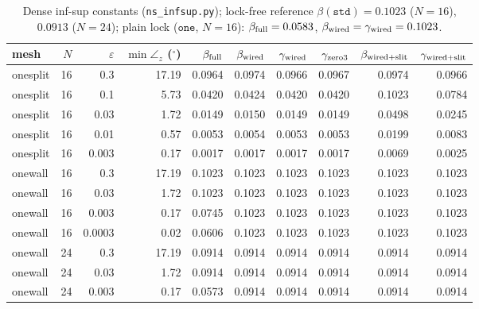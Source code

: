 \begin{table}[ht]\centering\small
\begin{tabular}{lrrrrrrrrr}\toprule
mesh & $N$ & $\varepsilon$ & $\min\angle_z$ ($^\circ$) & $\beta_{\rm full}$ & $\beta_{\rm wired}$ & $\gamma_{\rm wired}$ & $\gamma_{\rm zero3}$ & $\beta_{\rm wired+slit}$ & $\gamma_{\rm wired+slit}$\\\midrule
onesplit & 16 & 0.3 & 17.19 & 0.0964 & 0.0974 & 0.0966 & 0.0967 & 0.0974 & 0.0966\\
onesplit & 16 & 0.1 & 5.73 & 0.0420 & 0.0424 & 0.0420 & 0.0420 & 0.1023 & 0.0784\\
onesplit & 16 & 0.03 & 1.72 & 0.0149 & 0.0150 & 0.0149 & 0.0149 & 0.0498 & 0.0245\\
onesplit & 16 & 0.01 & 0.57 & 0.0053 & 0.0054 & 0.0053 & 0.0053 & 0.0199 & 0.0083\\
onesplit & 16 & 0.003 & 0.17 & 0.0017 & 0.0017 & 0.0017 & 0.0017 & 0.0069 & 0.0025\\
onewall & 16 & 0.3 & 17.19 & 0.1023 & 0.1023 & 0.1023 & 0.1023 & 0.1023 & 0.1023\\
onewall & 16 & 0.03 & 1.72 & 0.1023 & 0.1023 & 0.1023 & 0.1023 & 0.1023 & 0.1023\\
onewall & 16 & 0.003 & 0.17 & 0.0745 & 0.1023 & 0.1023 & 0.1023 & 0.1023 & 0.1023\\
onewall & 16 & 0.0003 & 0.02 & 0.0606 & 0.1023 & 0.1023 & 0.1023 & 0.1023 & 0.1023\\
onewall & 24 & 0.3 & 17.19 & 0.0914 & 0.0914 & 0.0914 & 0.0914 & 0.0914 & 0.0914\\
onewall & 24 & 0.03 & 1.72 & 0.0914 & 0.0914 & 0.0914 & 0.0914 & 0.0914 & 0.0914\\
onewall & 24 & 0.003 & 0.17 & 0.0573 & 0.0914 & 0.0914 & 0.0914 & 0.0914 & 0.0914\\
\bottomrule\end{tabular}
\caption{Dense inf-sup constants (\texttt{ns\_infsup.py}); lock-free reference $\beta(\texttt{std})=0.1023$ ($N=16$), $0.0913$ ($N=24$);
plain lock ($\texttt{one}$, $N=16$): $\beta_{\rm full}=0.0583$, $\beta_{\rm wired}=\gamma_{\rm wired}=0.1023$.}\label{tab:infsup}
\end{table}

